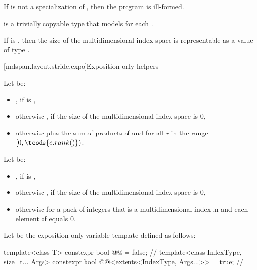 \pnum
If  is not a specialization of ,
then the program is ill-formed.

\pnum
{} is a trivially copyable type
that models  for each .

\pnum
\mandates
If  is ,
then the size of the multidimensional index space 
is representable as a value of type .

[mdspan.layout.stride.expo]{Exposition-only helpers}

\pnum
Let  be:
\begin{itemize}
\item
{}, if  is ,
\item
otherwise , if the size of the multidimensional index space  is 0,
\item
otherwise  plus the sum of products of  and 
for all $r$ in the range $[0, \tcode{e.rank()})$.
\end{itemize}

\pnum
Let  be:
\begin{itemize}
\item
{}, if  is ,
\item
otherwise , if the size of the multidimensional index space  is 0,
\item
otherwise  for a pack of integers 
that is a multidimensional index in  and
each element of  equals 0.
\end{itemize}

\pnum
Let  be the exposition-only variable template
defined as follows:
\begin{codeblock}
template<class T>
  constexpr bool @@ = false;                              // \expos
template<class IndexType, size_t... Args>
  constexpr bool @@<extents<IndexType, Args...>> = true;  // \expos
\end{codeblock}

